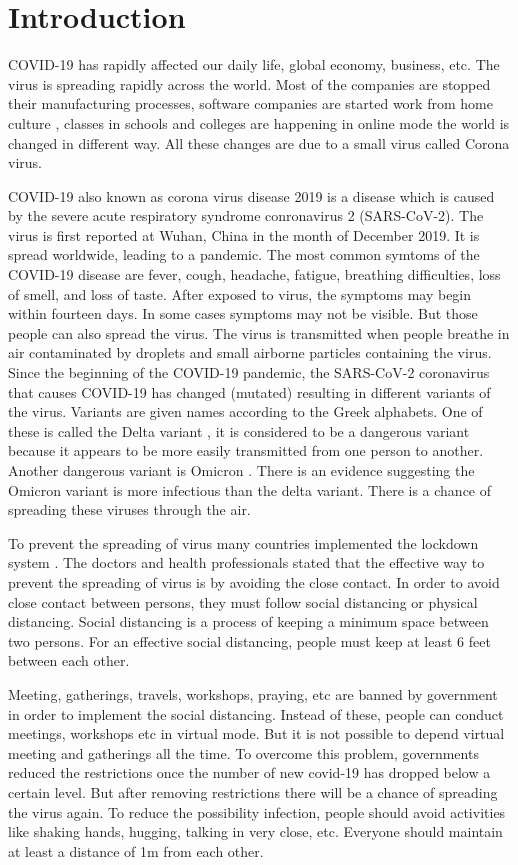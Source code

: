 \documentclass{svproc}
\begin{document}
\section{Introduction}
COVID-19 has rapidly affected our daily life, global economy, business, etc. The virus is spreading rapidly across the world. Most of the companies are stopped their manufacturing processes, software companies are started work from home culture , classes in schools and colleges are happening in online mode the world is changed in different way. All these changes are due to a small virus called Corona virus. 
\par 
COVID-19 also known as corona virus disease 2019 is a disease which is caused by the severe acute respiratory syndrome conronavirus 2 (SARS-CoV-2). The virus is first reported at Wuhan, China in the month of December 2019. It is spread worldwide, leading to a pandemic. The most common symtoms of the COVID-19 disease are fever, cough, headache, fatigue, breathing difficulties, loss of smell, and loss of taste. After exposed to virus, the symptoms may begin within fourteen days. In some cases symptoms may not be visible. But those people can also spread the virus. The virus is transmitted when people breathe in air contaminated by droplets and small airborne particles containing the virus. Since the beginning of the COVID-19 pandemic, the SARS-CoV-2 coronavirus that causes COVID-19 has changed (mutated) resulting in different variants of the virus. Variants are given names according to the Greek alphabets. One of these is called the Delta variant \cite{delta}, it is considered to be a dangerous variant because it appears to be more easily transmitted from one person to another. Another dangerous variant is Omicron \cite{omicron}. There is an evidence suggesting the Omicron variant is more infectious than the delta variant. There is a chance of spreading these viruses through the air. 
\par 
To prevent the spreading of virus many countries implemented the lockdown system \cite{lockdown}. The doctors and health professionals stated that the effective way to prevent the spreading of virus is by avoiding the close contact. In order to avoid close contact between persons, they must follow social distancing or physical distancing. Social distancing is a process of keeping a minimum space between two persons. For an effective social distancing, people must keep at least 6 feet between each other.
\par 
Meeting, gatherings, travels, workshops, praying, etc are banned by government in order to implement the social distancing. Instead of these, people can conduct meetings, workshops etc in virtual mode. But it is not possible to depend virtual meeting and gatherings all the time. To overcome this problem, governments reduced the restrictions once the number of new covid-19 has dropped below a certain level. But after removing restrictions there will be a chance of spreading the virus again. To reduce the possibility infection, people should avoid activities like shaking hands, hugging, talking in very close, etc. Everyone should maintain at least a distance of 1m from each other.
\end{document}

